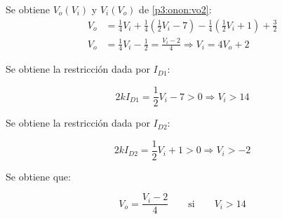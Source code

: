 Se obtiene $V_o(V_i)$ y $V_i(V_o)$ de \ref{p3:onon:vo2}:
\begin{align*}
  V_o &=
    \frac{1}{4} V_i
    + \frac{1}{4} \left( \frac{1}{2} V_i - 7 \right)
    - \frac{1}{4} \left( \frac{1}{2} V_i + 1 \right)
    + \frac{3}{2}
  \\
  V_o &= \frac{1}{4} V_i - \frac{1}{2} = \frac{V_i - 2}{4} \Rightarrow V_i = 4 V_o + 2
\end{align*}

Se obtiene la restricción dada por $I_{D1}$:

\begin{equation*}
  2k I_{D1} = \frac{1}{2} V_i - 7 > 0
  \Rightarrow
  V_i > 14
\end{equation*}

Se obtiene la restricción dada por $I_{D2}$:

\begin{equation*}
  2k I_{D2} = \frac{1}{2} V_i + 1 > 0
  \Rightarrow
  V_i > -2
\end{equation*}

Se obtiene que:

\begin{equation} \label{p3:onon}
  V_o = \frac{V_i - 2}{4}
  \quad
  \quad
  \mathrm{si}
  \quad
  \quad
  V_i > 14
\end{equation}
